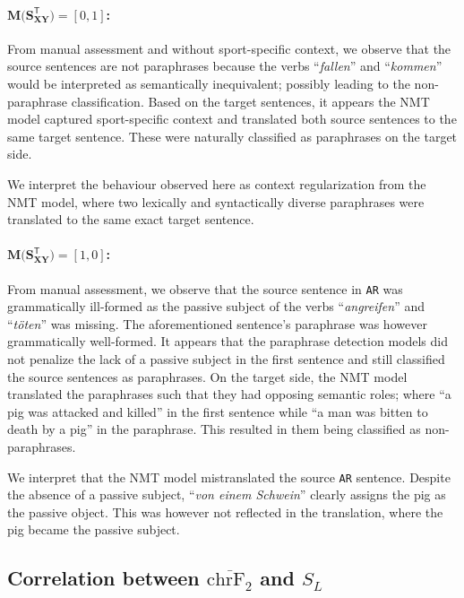 \documentclass[11pt,a4paper]{article}
\begin{document}
\paragraph{$\mathbf{M(S_{XY}^{\mathsf{T}}}) = [0,1]$:} From manual assessment and without sport-specific context, we observe that the source sentences are not paraphrases because the verbs ``\textit{fallen}'' and ``\textit{kommen}'' would be interpreted as semantically inequivalent; possibly leading to the non-paraphrase classification. Based on the target sentences, it appears the NMT model captured sport-specific context and translated both source sentences to the same target sentence. These were naturally classified as paraphrases on the target side.

We interpret the behaviour observed here as context regularization from the NMT model, where two lexically and syntactically diverse paraphrases were translated to the same exact target sentence.

\paragraph{$\mathbf{M(S_{XY}^{\mathsf{T}}}) = [1,0]$:} From manual assessment, we observe that the source sentence in \texttt{AR} was grammatically ill-formed as the passive subject of the verbs ``\textit{angreifen}'' and ``\textit{töten}'' was missing. The aforementioned sentence's paraphrase was however grammatically well-formed. It appears that the paraphrase detection models did not penalize the lack of a passive subject in the first sentence and still classified the source sentences as paraphrases. On the target side, the NMT model translated the paraphrases such that they had opposing semantic roles; where ``a pig was attacked and killed'' in the first sentence while ``a man was bitten to death by a pig'' in the paraphrase. This resulted in them being classified as non-paraphrases.

We interpret that the NMT model mistranslated the source \texttt{AR} sentence. Despite the absence of a passive subject, ``\textit{von einem Schwein}'' clearly assigns the pig as the passive object. This was however not reflected in the translation, where the pig became the passive subject.


\subsection{Correlation between $\overline{\text{chrF}_2}$ and $S_L$}
\end{document}
